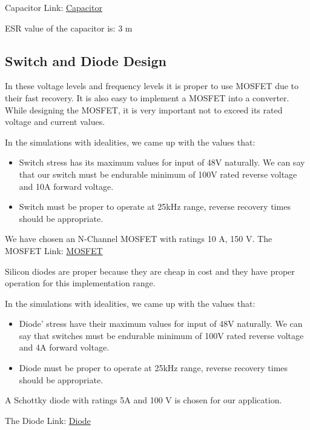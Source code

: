 Capacitor Link: \href{https://product.tdk.com/info/en/documents/chara_sheet/C3216JB1E336M160AC.pdf}{Capacitor}

ESR value of the capacitor is: 3 m\ohm


\subsection{Switch and Diode Design}

In these voltage levels and frequency levels it is proper to use MOSFET due to their fast recovery. It is also easy to implement a MOSFET into a converter. While designing the MOSFET, it is very important not to exceed its rated voltage and current values.

In the simulations with idealities, we came up with the values that:

\begin{itemize}
    \item Switch stress has its maximum values for input of 48V naturally. We can say that our switch must be endurable minimum of 100V rated reverse voltage and 10A forward voltage.
    \item Switch must be proper to operate at 25kHz range, reverse recovery times should be appropriate.
\end{itemize}
We have chosen an N-Channel MOSFET with ratings 10 A, 150 V.
The MOSFET Link: \href{https://www.digikey.com/product-detail/en/on-semiconductor/FDMS86255/FDMS86255TR-ND/4555505}{MOSFET}



Silicon diodes are proper because they are cheap in cost and they have proper operation for this implementation range. 

In the simulations with idealities, we came up with the values that:

\begin{itemize}
    \item Diode' stress have their maximum values for input of 48V naturally. We can say that switches must be endurable minimum of 100V rated reverse voltage and 4A forward voltage.
    \item Diode must be proper to operate at 25kHz range, reverse recovery times should be appropriate.
\end{itemize}

A Schottky diode with ratings 5A and 100 V is chosen for our application. 


The Diode Link: \href{https://www.digikey.com/product-detail/en/vishay-semiconductor-diodes-division/SS5P10-M3-86A/SS5P10-M3-86AGICT-ND/2048223}{Diode}


